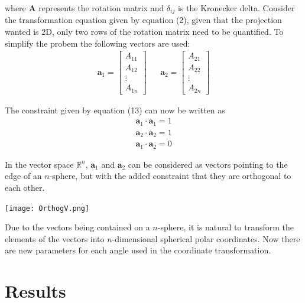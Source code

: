 \documentclass[a4paper,11pt,twoside]{article}
\begin{document}
where $\bm{A}$ represents the rotation matrix and $\delta_{ij}$ is the Kronecker delta. Consider the transformation equation given by equation (2), given that the projection wanted is 2D, only two rows of the rotation matrix need to be quantified. To simplify the probem the following vectors are used: 
\begin{align}
\bm{a}_1 = \begin{bmatrix}
           A_{11} \\
           A_{12} \\
           \vdots \\
           A_{1n}
           \end{bmatrix} 
           && 
\bm{a}_2 = \begin{bmatrix}
           A_{21} \\
           A_{22} \\
           \vdots \\
           A_{2n}
           \end{bmatrix}
\end{align} 

The constraint given by equation (13) can now be written as
\begin{equation}
\begin{split}
\bm{a}_1 \cdot \bm{a}_1 = 1
\\
\bm{a}_2 \cdot \bm{a}_2 = 1
\\
\bm{a}_1 \cdot \bm{a}_2 = 0
\end{split}
\end{equation}

In the vector space $\mathbb{R}^n$, $\bm{a}_1$ and $\bm{a}_2$ can be considered as vectors pointing to the edge of an $n$-sphere, but with the added constraint that they are orthogonal to each other. 
\begin{center}
\texttt{[image: OrthogV.png]}

\end{center}

Due to the vectors being contained on a $n$-sphere, it is natural to transform the elements of the vectors into $n$-dimensional spherical polar coordinates. Now there are new parameters for each angle used in the coordinate transformation.
\newline

\newpage
\section{Results}
\end{document}

